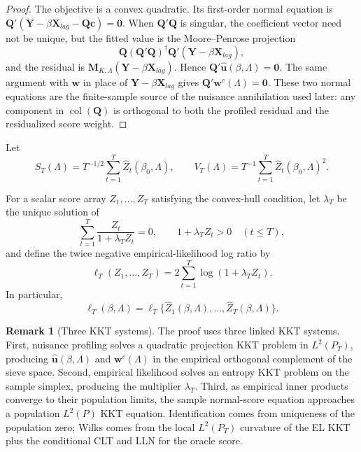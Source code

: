 \documentclass[12pt]{article}
\numberwithin{equation}{section}
\theoremstyle{definition}
\newtheorem{remark}{Remark}
\begin{document}
\begin{proof}
The objective is a convex quadratic. Its first-order normal equation is
\(\bm Q'(\bm Y-\beta\bm X_{lag}-\bm Q\bm c)=\bm0\). When \(\bm Q'\bm Q\) is
singular, the coefficient vector need not be unique, but the fitted value is
the Moore--Penrose projection
\[
    \bm Q(\bm Q'\bm Q)^\dagger\bm Q'(\bm Y-\beta\bm X_{lag}),
\]
and the residual is \(\bm M_{K,\Lambda}(\bm Y-\beta\bm X_{lag})\). Hence
\(\bm Q'\widehat{\bm u}(\beta,\Lambda)=\bm0\). The same argument with
\(\bm w\) in place of \(\bm Y-\beta\bm X_{lag}\) gives
\(\bm Q'\bm w^c(\Lambda)=\bm0\). These two normal equations are the
finite-sample source of the nuisance annihilation used later: any component in
\(\operatorname{col}(\bm Q)\) is orthogonal to both the profiled residual and
the residualized score weight.
\end{proof}

Let
\[
    S_T(\Lambda)
    =
    T^{-1/2}\sum_{t=1}^T\widehat Z_t(\beta_0,\Lambda),
    \qquad
    V_T(\Lambda)
    =
    T^{-1}\sum_{t=1}^T\widehat Z_t(\beta_0,\Lambda)^2.
\]

For a scalar score array \(Z_1,\ldots,Z_T\) satisfying the convex-hull
condition, let \(\lambda_T\) be the unique solution of
\[
    \sum_{t=1}^T\frac{Z_t}{1+\lambda_T Z_t}=0,
    \qquad
    1+\lambda_T Z_t>0\quad(t\leq T),
\]
and define the twice negative empirical-likelihood log ratio by
\begin{equation}
    \ell_T(Z_1,\ldots,Z_T)
    =2\sum_{t=1}^T\log(1+\lambda_TZ_t).
    \label{eq:sol-el-definition}
\end{equation}
In particular,
\[
    \ell_T(\beta,\Lambda)
    =\ell_T\{\widehat Z_1(\beta,\Lambda),\ldots,
                    \widehat Z_T(\beta,\Lambda)\}.
\]

\begin{remark}[Three KKT systems]
\label{rem:three-kkt-systems}
The proof uses three linked KKT systems. First, nuisance profiling solves a
quadratic projection KKT problem in \(L^2(P_T)\), producing
\(\widehat{\bm u}(\beta,\Lambda)\) and \(\bm w^c(\Lambda)\) in the empirical
orthogonal complement of the sieve space. Second, empirical likelihood solves
an entropy KKT problem on the sample simplex, producing the multiplier
\(\lambda_T\). Third, as empirical inner products converge to their population
limits, the sample normal-score equation approaches a population \(L^2(P)\)
KKT equation. Identification comes from uniqueness of the population zero;
Wilks comes from the local \(L^2(P_T)\) curvature of the EL KKT plus the
conditional CLT and LLN for the oracle score.
\end{remark}
\end{document}
